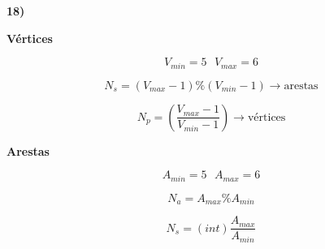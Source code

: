 \newpage 

\textbf{18)} 

\begin{center}
    \textbf{Vértices}
\end{center}

\begin{equation*}
    V_{min} = 5 \text{ } V_{max} = 6
\end{equation*}

\begin{equation*}
    N_s = (V_{max} -1) \% (V_{min} -1) \rightarrow \text{arestas}
\end{equation*}

\begin{equation*}
    N_p = (\frac{V_{max}-1}{V_{min}-1}) \rightarrow \text{vértices}
\end{equation*}

\begin{center}
    \textbf{Arestas}
\end{center}

\begin{equation*}
    A_{min} = 5 \text{ } A_{max} = 6
\end{equation*}

\begin{equation*}
    N_a = A_{max} \% A_{min}
\end{equation*}

\begin{equation*}
    N_s = (int)\frac{A_{max}}{A_{min}}
\end{equation*}




